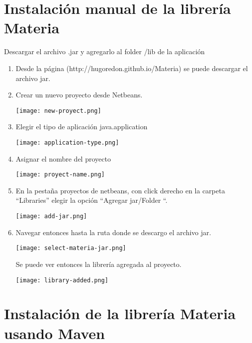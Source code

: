 	\section{Instalación manual de la librería Materia}\label{sec:manualInstall}
		Descargar el archivo .jar y agregarlo al folder /lib de la aplicación
		\begin{enumerate}
			\item Desde la página (http://hugoredon.github.io/Materia) se puede descargar el archivo jar.

			\item Crear un nuevo proyecto desde Netbeans.

			\begin{center}
			  \texttt{[image: new-proyect.png]}
			\end{center}

			\item Elegir el tipo de aplicación java.application 
			\begin{center}
			  \texttt{[image: application-type.png]} 
			\end{center}
			\item Asignar el nombre del proyecto 
			\begin{center}
			  \texttt{[image: proyect-name.png]} 
			\end{center}
			\item En la pestaña proyectos de netbeans, con click derecho en la carpeta “Libraries” elegir la opción “Agregar jar/Folder “.
			\begin{center}
			  \texttt{[image: add-jar.png]} 
			\end{center}


			 \item Navegar entonces hasta la ruta donde se descargo el archivo jar. 

			\begin{center}
			  \texttt{[image: select-materia-jar.png]} 
			\end{center}

			Se puede ver entonces la librería agregada al proyecto.

			\begin{center}
			  \texttt{[image: library-added.png]} 
			\end{center}
		\end{enumerate}

	\section{Instalación de la librería Materia usando Maven}\label{sec:mavenInstall}

